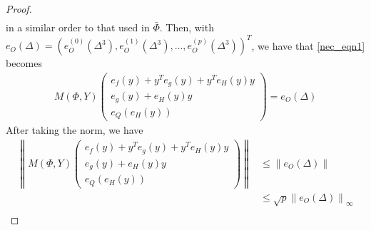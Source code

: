 \begin{proof}
\begin{align*}
\end{align*}
in a similar order to that used in $\bar \Phi$.
Then, with $e_O\left(\Delta\right) = \left(
e^{(0)}_O\left(\Delta^3\right),
e^{(1)}_O\left(\Delta^3\right),
\ldots ,
e^{(p)}_O\left(\Delta^3\right)
\right)^T$,
we have that \cref{nec_eqn1} becomes
\begin{align*}
M\left(\Phi, Y\right)
\begin{pmatrix}
e_f(y) + y^Te_g(y) + y^Te_H(y) y \\
e_g(y) + e_H(y) y \\
e_Q\left(e_H(y)\right)
\end{pmatrix}
= e_O\left(\Delta\right)
\end{align*}
After taking the norm, we have
\begin{align*}
\left\|M(\Phi,Y)
\begin{pmatrix}
e_f(y) + y^Te_g(y) + y^Te_H(y) y \\
e_g(y) + e_H(y) y \\
e_Q\left(e_H(y)\right)
\end{pmatrix}\right\|
&\le \left\|e_O\left(\Delta\right)\right\| \\
&\le \sqrt{p} \left\|e_O\left(\Delta\right)\right\|_{\infty} \\

\end{align*}
\end{proof}
